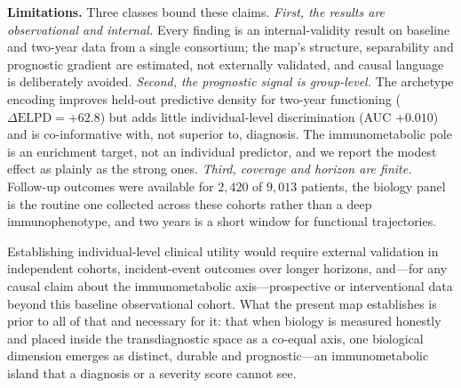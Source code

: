 \medskip\noindent\textbf{Limitations.} Three classes bound these claims.
\emph{First, the results are observational and internal.} Every finding is an internal-validity
result on baseline and two-year data from a single consortium; the map's structure, separability
and prognostic gradient are estimated, not externally validated, and causal language is
deliberately avoided.
\emph{Second, the prognostic signal is group-level.} The archetype encoding improves held-out
predictive density for two-year functioning ($\Delta\text{ELPD}=+62.8$) but adds little
individual-level discrimination (AUC $+0.010$) and is co-informative with, not superior to,
diagnosis. The immunometabolic pole is an enrichment target, not an individual predictor, and we
report the modest effect as plainly as the strong ones.
\emph{Third, coverage and horizon are finite.} Follow-up outcomes were available for $2{,}420$ of
$9{,}013$ patients, the biology panel is the routine one collected across these cohorts rather than
a deep immunophenotype, and two years is a short window for functional trajectories.

Establishing individual-level clinical utility would require external validation in independent
cohorts, incident-event outcomes over longer horizons, and---for any causal claim about the
immunometabolic axis---prospective or interventional data beyond this baseline observational
cohort. What the present map establishes is prior to all of that and necessary for it: that when
biology is measured honestly and placed inside the transdiagnostic space as a co-equal axis, one
biological dimension emerges as distinct, durable and prognostic---an immunometabolic island that
a diagnosis or a severity score cannot see.
